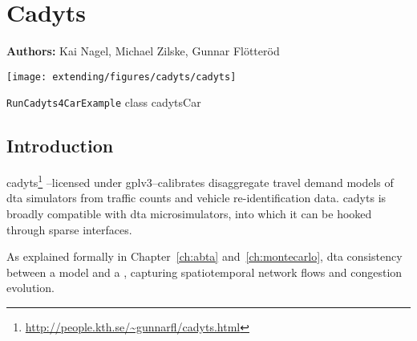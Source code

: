 \chapter{Cadyts}
\label{ch:cadyts}

\hfill \textbf{Authors:} Kai Nagel, Michael Zilske, Gunnar Fl\"otter\"od

\begin{center} \texttt{[image: extending/figures/cadyts/cadyts]} \end{center}


{\lstinline{RunCadyts4CarExample} class}
{cadytsCar}
{\citet[][]{cadyts-manual, floetteroed-2010e, FloetteroedChenEtAl2011BehavioralCalibAndAnaNETS, Floetteroed2008PhD, Moyo2013PhD}}



\section{Introduction}

\gls{cadyts}\footnote{\url{http://people.kth.se/~gunnarfl/cadyts.html}}
--licensed under \gls{gplv3}--calibrates disaggregate travel demand models 
of \gls{dta} simulators from traffic counts and vehicle re-identification data. 
\gls{cadyts} is broadly compatible with \gls{dta} microsimulators,
into which it can be hooked through sparse interfaces.

As explained formally in Chapter~\ref{ch:abta} and~\ref{ch:montecarlo},
\gls{dta}  consistency between a  model and a
, capturing
spatiotemporal network flows and congestion evolution.

